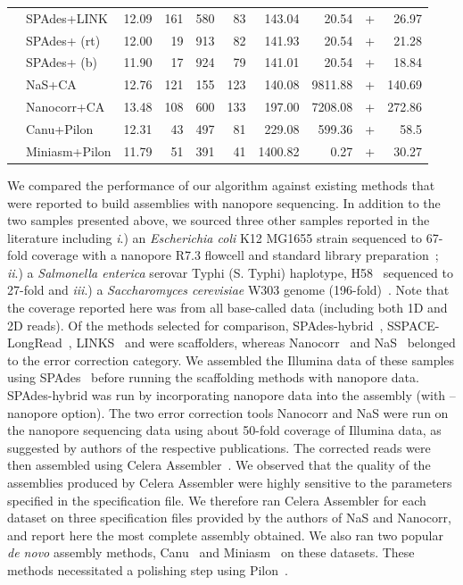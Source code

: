 \begin{longtable}{llcrrrrr@{\hspace{2pt}}c@{\hspace{2pt}}r}
 & SPAdes+LINK & 12.09 & 161 & 580 & 83 & 143.04 & 20.54 & + & 26.97 \\
 & SPAdes+\npscarf{} (rt) & 12.00 & 19 & 913 & 82 & 141.93 & 20.54 &
 + & 21.28 \\
 & SPAdes+\npscarf{} (b) & 11.90 & 17 & 924 & 79 & 141.01 & 20.54 & + &
 18.84 \\
 & NaS+CA & 12.76 & 121 & 155 & 123 & 140.08 & 9811.88 & + & 140.69 \\
 & Nanocorr+CA & 13.48 & 108 & 600 & 133 & 197.00 & 7208.08 & + & 272.86
 \\
 & Canu+Pilon & 12.31 & 43 & 497 & 81 & 229.08 & 599.36 & + & 58.5 \\
 & Miniasm+Pilon & 11.79 & 51 & 391 & 41 & 1400.82 & 0.27 & + & 30.27 \\
\end{longtable}

\normalsize

We compared the performance of our algorithm against existing methods that were
reported to build assemblies with nanopore sequencing. In addition to the two
samples presented above, we sourced three other samples reported in the
literature including \emph{i}.) an \emph{Escherichia coli} K12 MG1655
strain sequenced to 67-fold coverage with a nanopore R7.3 flowcell and standard
library preparation~\cite{QuickQL2014}; \emph{ii}.) a \emph{Salmonella
enterica} serovar Typhi (S. Typhi) haplotype, H58~\cite{AshtonND2015} sequenced to
27-fold and \emph{iii}.) a \emph{Saccharomyces cerevisiae} W303 genome
(196-fold)~\cite{GoodwinGE2015}.
Note that the coverage reported here was from all base-called data (including
both 1D and 2D reads). Of the methods selected for comparison,
SPAdes-hybrid~\cite{BankevichNA2012}, SSPACE-LongRead~\cite{BoetzerP2014},
LINKS~\cite{WarrenYV2015} and \npscarf{} were scaffolders, whereas
Nanocorr~\cite{GoodwinGE2015} and NaS~\cite{MadouiEC2015} belonged to the
error correction category. We assembled the Illumina data of these samples using
SPAdes~\cite{BankevichNA2012} before running the scaffolding methods with
nanopore data. SPAdes-hybrid was run by incorporating nanopore data into the
assembly (with --nanopore option). The two error correction tools Nanocorr and
NaS were run on the nanopore sequencing data using about 50-fold coverage of
Illumina data, as suggested by authors of the respective publications. The corrected
reads were then assembled using Celera Assembler~\cite{MyersSD2000}. We
observed that the quality of the assemblies produced by Celera Assembler were
highly sensitive to the parameters specified in the specification file. We
therefore ran Celera Assembler for each dataset on three specification files
provided by the authors of NaS and Nanocorr, and report here the most complete
assembly obtained.
We also ran two popular \emph{de novo} assembly methods,
Canu~\cite{BerlinKC2015} and Miniasm~\cite{Li2016} on these datasets.
These methods necessitated a polishing step using Pilon~\cite{WalkerAS2014}.


